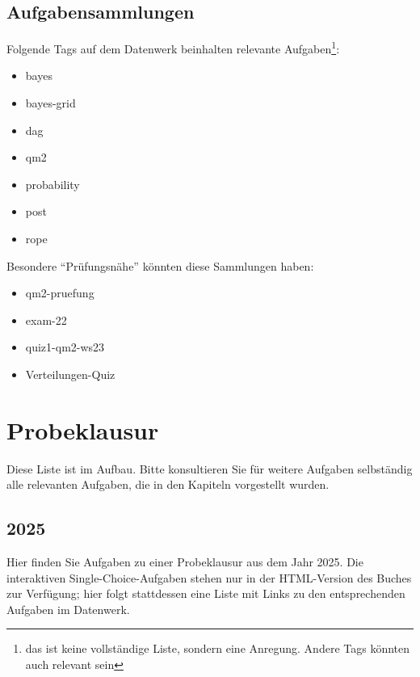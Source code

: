 \documentclass[
  ngerman,
  letterpaper,
  twoside,
  open=any]{scrbook}
\providecommand{\tightlist}{%
  \setlength{\itemsep}{0pt}\setlength{\parskip}{0pt}}\usepackage{longtable,booktabs,array}
\theoremstyle{definition}
\theoremstyle{plain}
\theoremstyle{definition}
\theoremstyle{definition}
\theoremstyle{definition}
\theoremstyle{definition}
\theoremstyle{remark}
\begin{document}
\section{Aufgabensammlungen}\label{aufgabensammlungen}

Folgende Tags auf dem Datenwerk beinhalten relevante
Aufgaben\footnote{das ist keine vollständige Liste, sondern eine
  Anregung. Andere Tags könnten auch relevant sein}:

\begin{itemize}
\tightlist
\item
  bayes
\item
  bayes-grid
\item
  dag
\item
  qm2
\item
  probability
\item
  post
\item
  rope
\end{itemize}

Besondere \enquote{Prüfungsnähe} könnten diese Sammlungen haben:

\begin{itemize}
\tightlist
\item
  qm2-pruefung
\item
  exam-22
\item
  quiz1-qm2-ws23
\item
  Verteilungen-Quiz
\end{itemize}

\chapter{Probeklausur}\label{probeklausur}

Diese Liste ist im Aufbau. Bitte konsultieren Sie für weitere Aufgaben
selbständig alle relevanten Aufgaben, die in den Kapiteln vorgestellt
wurden.

\section{2025}\label{section-16}

Hier finden Sie Aufgaben zu einer Probeklausur aus dem Jahr 2025. Die
interaktiven Single-Choice-Aufgaben stehen nur in der HTML-Version des
Buches zur Verfügung; hier folgt stattdessen eine Liste mit Links zu den
entsprechenden Aufgaben im Datenwerk.
\end{document}
